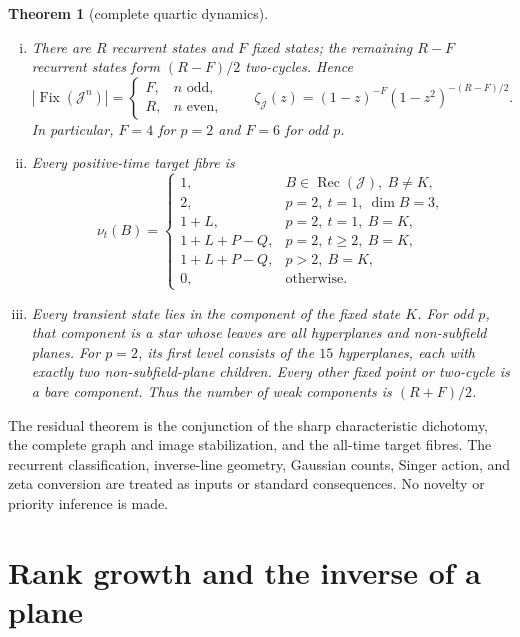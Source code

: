 \documentclass[a4paper,10pt]{amsart}
\newtheorem{theorem}{Theorem}
\theoremstyle{remark}
\newcommand{\K}{K}
\newcommand{\J}{\mathcal J}
\newcommand{\Rec}{\operatorname{Rec}}
\newcommand{\Fix}{\operatorname{Fix}}
\begin{document}
\begin{theorem}[complete quartic dynamics]
\begin{enumerate}[(i)]
\item There are $R$ recurrent states and $F$ fixed states; the remaining
$R-F$ recurrent states form $(R-F)/2$ two-cycles.  Hence
\begin{equation}\label{eq:fix-iterates}
 |\Fix(\J^n)|=
 \begin{cases}F,&n\text{ odd},\\R,&n\text{ even},\end{cases}
 \qquad
 \zeta_{\J}(z)=(1-z)^{-F}(1-z^2)^{-(R-F)/2}.
\end{equation}
In particular, $F=4$ for $p=2$ and $F=6$ for odd $p$.

\item Every positive-time target fibre is
\begin{equation}\label{eq:fibres}
 \nu_t(B)=
 \begin{cases}
 1,&B\in\Rec(\J),\ B\ne\K,\\
 2,&p=2,\ t=1,\ \dim B=3,\\
 1+L,&p=2,\ t=1,\ B=\K,\\
 1+L+P-Q,&p=2,\ t\geq2,\ B=\K,\\
 1+L+P-Q,&p>2,\ B=\K,\\
 0,&\text{otherwise}.
 \end{cases}
\end{equation}

\item Every transient state lies in the component of the fixed state $\K$.
For odd $p$, that component is a star whose leaves are all hyperplanes and
non-subfield planes.  For $p=2$, its first level consists of the $15$
hyperplanes, each with exactly two non-subfield-plane children.  Every other
fixed point or two-cycle is a bare component.  Thus the number of weak
components is $(R+F)/2$.
\end{enumerate}
\end{theorem}

The residual theorem is the conjunction of the sharp characteristic
dichotomy, the complete graph and image stabilization, and the all-time
target fibres.  The recurrent classification, inverse-line geometry,
Gaussian counts, Singer action, and zeta conversion are treated as inputs or
standard consequences.  No novelty or priority inference is made.

\section{Rank growth and the inverse of a plane}
\end{document}
